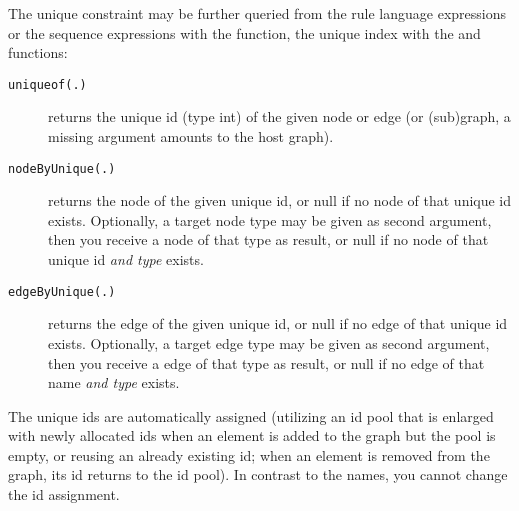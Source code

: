 The unique constraint may be further queried from the rule language expressions or the sequence expressions with the \texttt{} function,
the unique index with the \texttt{} and \texttt{} functions:
\begin{description}
\item[\texttt{uniqueof(.)}] returns the unique id (type int) of the given node or edge (or (sub)graph, a missing argument amounts to the host graph).
\item[\texttt{nodeByUnique(.)}] returns the node of the given unique id, or null if no node of that unique id exists. Optionally, a target node type may be given as second argument, then you receive a node of that type as result, or null if no node of that unique id \emph{and type} exists.
\item[\texttt{edgeByUnique(.)}] returns the edge of the given unique id, or null if no edge of that unique id exists. Optionally, a target edge type may be given as second argument, then you receive a edge of that type as result, or null if no edge of that name \emph{and type} exists.
\end{description}

The unique ids are automatically assigned (utilizing an id pool that is enlarged with newly allocated ids when an element is added to the graph but the pool is empty, or reusing an already existing id; when an element is removed from the graph, its id returns to the id pool).
In contrast to the names, you cannot change the id assignment.

